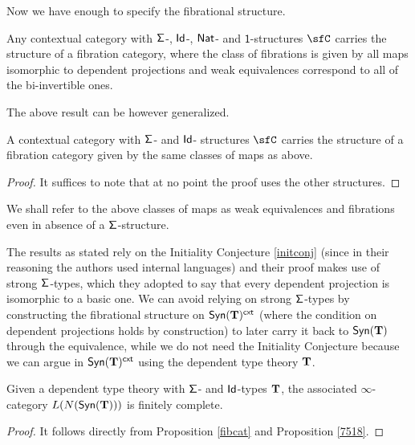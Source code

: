 \noindent
Now we have enough to specify the fibrational structure.

\begin{prop}
  Any contextual category with $\operatorname{\mathsf{\Sigma}}$-, $\operatorname{\mathsf{Id}}$-, $\operatorname{\mathsf{Nat}}$- and
  $\mathsf{1}$-structures $\sfC$ carries the structure of a fibration category,
  where the class of fibrations is given by all maps isomorphic to dependent
  projections and weak equivalences correspond to all of the bi-invertible ones.
\end{prop}

\noindent
The above result can be however generalized.

\begin{prop}\label{fibcat}
  A contextual category with $\operatorname{\mathsf{\Sigma}}$- and $\operatorname{\mathsf{Id}}$- structures $\sfC$ carries
  the structure of a fibration category given by the same classes of maps as
  above.
\end{prop}
\begin{proof}
  It suffices to note that at no point the proof uses the other structures.
\end{proof}

\begin{rmk}
  We shall refer to the above classes of maps as weak equivalences and
  fibrations even in absence of a $\operatorname{\mathsf{\Sigma}}$-structure.
\end{rmk}

\begin{rmk}
  The results as stated rely on the Initiality Conjecture \ref{initconj} (since
  in their reasoning the authors used internal languages) and their proof makes
  use of strong $\operatorname{\mathsf{\Sigma}}$-types, which they adopted to say that every dependent
  projection is isomorphic to a basic one. We
  can avoid relying on strong $\operatorname{\mathsf{\Sigma}}$-types by constructing the fibrational
  structure on $\mathsf{Syn}(\mathbf{T})^{\operatorname{\mathsf{cxt}}}$ (where the condition on dependent projections
  holds by construction) to later carry it back to $\mathsf{Syn}(\mathbf{T})$ through the
  equivalence, while we do not need the Initiality Conjecture because we can
  argue in $\mathsf{Syn}(\mathbf{T})^{\operatorname{\mathsf{cxt}}}$ using the dependent type theory $\operatorname{\mathbf{T}}$.
\end{rmk}

\begin{cor}\label{fincompl1}
  Given a dependent type theory with $\operatorname{\mathsf{\Sigma}}$- and $\operatorname{\mathsf{Id}}$-types $\operatorname{\mathbf{T}}$, the
  associated $\infty$-category $L(N(\mathsf{Syn}(\mathbf{T})))$ is finitely complete.
\end{cor}
\begin{proof}
  It follows directly from Proposition \ref{fibcat} and Proposition \ref{7518}.
\end{proof}

